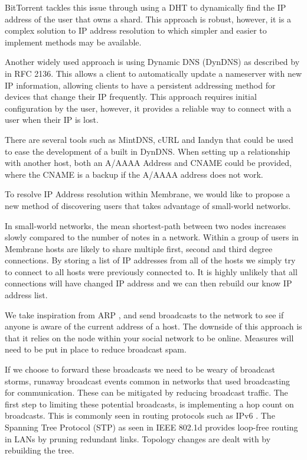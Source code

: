 \documentclass[11pt, a4paper, twoside]{report}
\begin{document}
BitTorrent tackles this issue through using a DHT to dynamically find the IP address of the user that owns a shard. This approach is robust, however, it is a complex solution to IP address resolution to which simpler and easier to implement methods may be available.

Another widely used approach is using Dynamic DNS (DynDNS) as described by \cite{bound1997dynamic} in RFC 2136. This allows a client to automatically update a nameserver with new IP information, allowing clients to have a persistent addressing method for devices that change their IP frequently. This approach requires initial configuration by the user, however, it provides a reliable way to connect with a user when their IP is lost.

There are several tools such as MintDNS, cURL and Iandyn that could be used to ease the development of a built in DynDNS. When setting up a relationship with another host, both an A/AAAA Address and CNAME could be provided, where the CNAME is a backup if the A/AAAA address does not work.

To resolve IP Address resolution within Membrane, we would like to propose a new method of discovering users that takes advantage of small-world networks. \citep{porter2012small}

In small-world networks, the mean shortest-path between two nodes increases slowly compared to the number of notes in a network. Within a group of users in Membrane hosts are likely to share multiple first, second and third degree connections. By storing a list of IP addresses from all of the hosts we simply try to connect to all hosts were previously connected to. It is highly unlikely that all connections will have changed IP address and we can then rebuild our know IP address list.

We take inspiration from ARP \citep{plummer1982ethernet}, and send broadcasts to the network to see if anyone is aware of the current address of a host. The downside of this approach is that it relies on the node within your social network to be online. Measures will need to be put in place to reduce broadcast spam.

If we choose to forward these broadcasts we need to be weary of broadcast storms, runaway broadcast events common in networks that used broadcasting for communication. \citep{Tseng:2002:BSP:506900.506905} These can be mitigated by reducing broadcast traffic. The first step to limiting these potential broadcasts, is implementing a hop count on broadcasts. This is commonly seen in routing protocols such as IPv6 \citep{deering1998internet}. The Spanning Tree Protocol (STP) as seen in IEEE 802.1d \citep*{ieee802ieee, sharma2004viking} provides loop-free routing in LANs by pruning redundant links. Topology changes are dealt with by rebuilding the tree.
\end{document}
